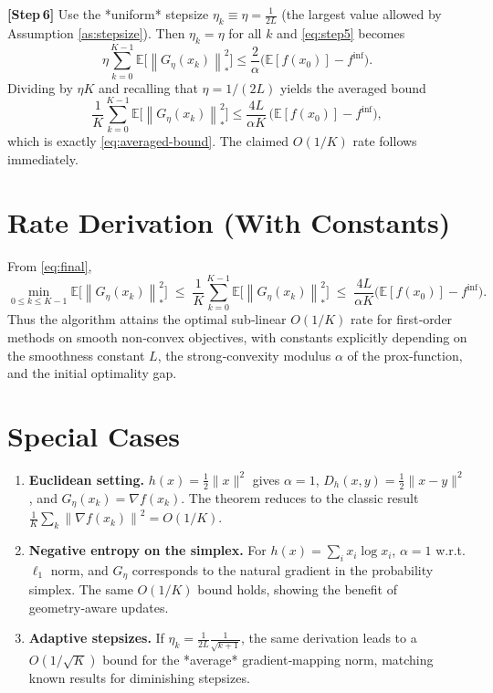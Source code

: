 \documentclass{article}
\newcommand{\E}{\mathbb{E}}
\newcommand{\norm}[1]{\left\|#1\right\|}
\newcommand{\grad}{\nabla}
\newcommand{\D}{D_{h}}
\begin{document}
\bigskip
\noindent\textbf{[Step 6]} Use the *uniform* stepsize $\eta_k\equiv\eta=\frac{1}{2L}$ (the largest value allowed by Assumption \ref{as:stepsize}). Then $\eta_k=\eta$ for all $k$ and \eqref{eq:step5} becomes
\[
\eta\sum_{k=0}^{K-1}\E\!\bigl[\norm{G_{\eta}(x_k)}_{*}^{2}\bigr]
\le
\frac{2}{\alpha}\bigl(\E[f(x_0)]-f^{\inf}\bigr).
\]
Dividing by $\eta K$ and recalling that $\eta=1/(2L)$ yields the averaged bound
\begin{equation}
\label{eq:final}
\frac{1}{K}\sum_{k=0}^{K-1}\E\!\bigl[\norm{G_{\eta}(x_k)}_{*}^{2}\bigr]
\le
\frac{4L}{\alpha K}\,\bigl(\E[f(x_0)]-f^{\inf}\bigr),
\end{equation}
which is exactly \eqref{eq:averaged-bound}. The claimed $O(1/K)$ rate follows immediately.

\hfill\qedsymbol

\section*{Rate Derivation (With Constants)}
From \eqref{eq:final},
\[
\min_{0\le k\le K-1}\E\!\bigl[\norm{G_{\eta}(x_k)}_{*}^{2}\bigr]
\;\le\;
\frac{1}{K}\sum_{k=0}^{K-1}\E\!\bigl[\norm{G_{\eta}(x_k)}_{*}^{2}\bigr]
\;\le\;
\frac{4L}{\alpha K}\bigl(\E[f(x_0)]-f^{\inf}\bigr).
\]
Thus the algorithm attains the optimal sub‑linear $O(1/K)$ rate for first‑order methods on smooth non‑convex objectives, with constants explicitly depending on the smoothness constant $L$, the strong‑convexity modulus $\alpha$ of the prox‑function, and the initial optimality gap.

\section*{Special Cases}
\begin{enumerate}
\item \textbf{Euclidean setting.} $h(x)=\frac12\|x\|^{2}$ gives $\alpha=1$, $\D(x,y)=\frac12\|x-y\|^{2}$, and $G_{\eta}(x_k)=\grad f(x_k)$. The theorem reduces to the classic result $\frac{1}{K}\sum_{k}\norm{\grad f(x_k)}^{2}=O(1/K)$.
\item \textbf{Negative entropy on the simplex.} For $h(x)=\sum_{i}x_i\log x_i$, $\alpha=1$ w.r.t. $\ell_{1}$ norm, and $G_{\eta}$ corresponds to the natural gradient in the probability simplex. The same $O(1/K)$ bound holds, showing the benefit of geometry‑aware updates.
\item \textbf{Adaptive stepsizes.} If $\eta_k=\frac{1}{2L}\frac{1}{\sqrt{k+1}}$, the same derivation leads to a $O(1/\sqrt{K})$ bound for the *average* gradient‑mapping norm, matching known results for diminishing stepsizes.
\end{enumerate}
\end{document}
